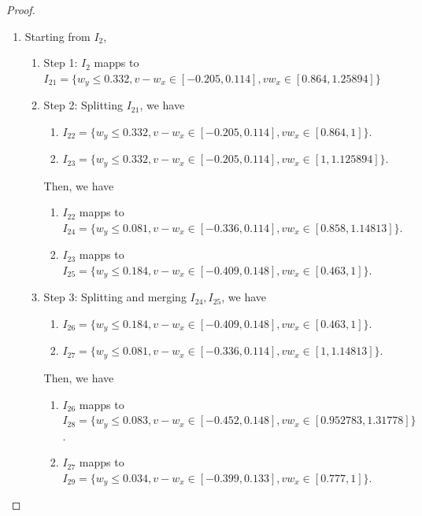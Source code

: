 \documentclass{article}
\theoremstyle{plain}
\theoremstyle{remark}
\begin{document}
\begin{proof}
\begin{enumerate}
    \item Starting from $I_2$,
    \begin{enumerate}
        \item Step 1: $I_2$ mapps to $I_{21}=\{w_y\le 0.332, v-w_x\in[-0.205, 0.114], vw_x \in[0.864, 1.25894]\}$
        \item Step 2: Splitting $I_{21}$, we have
            \begin{enumerate}
                \item $I_{22} = \{w_y\le 0.332, v-w_x\in[-0.205, 0.114], vw_x \in[0.864, 1]\}.$
                \item $I_{23} = \{w_y\le 0.332, v-w_x\in[-0.205, 0.114], vw_x \in[1, 1.125894]\}.$
            \end{enumerate}
            Then, we have
            \begin{enumerate}
                \item $I_{22}$ mapps to \\ $I_{24} = \{w_y\le 0.081, v-w_x\in[-0.336, 0.114], vw_x \in[0.858, 1.14813]\}$.
                \item $I_{23}$ mapps to \\ $I_{25} = \{w_y\le 0.184, v-w_x\in[-0.409, 0.148], vw_x \in[0.463, 1]\}$.
            \end{enumerate}
        \item Step 3: Splitting and merging $I_{24},I_{25}$, we have
            \begin{enumerate}
                \item $I_{26}=\{w_y\le 0.184, v-w_x\in[-0.409, 0.148], vw_x \in[0.463, 1]\}$.
                \item $I_{27}=\{w_y\le 0.081, v-w_x\in[-0.336, 0.114], vw_x \in[1, 1.14813]\}$.
            \end{enumerate}
            Then, we have 
            \begin{enumerate}
                \item $I_{26}$ mapps to \\ $I_{28} = \{w_y\le 0.083, v-w_x\in[-0.452, 0.148], vw_x \in[0.952783, 1.31778]\}$.
                \item $I_{27}$ mapps to \\ $I_{29} = \{w_y\le 0.034, v-w_x\in[-0.399, 0.133], vw_x \in[0.777, 1]\}$.
            \end{enumerate}
    \end{enumerate}
    

\end{enumerate}
\end{proof}
\end{document}
